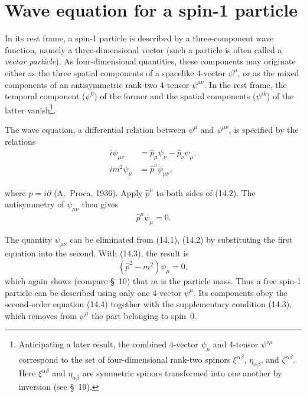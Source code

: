 
\section{Wave equation for a spin-1 particle}

In its rest frame, a spin-1 particle is described by a three-component wave function, namely a three-dimensional vector (such a particle is often called a \emph{vector particle}). As four-dimensional quantities, these components may originate either as the three spatial components of a spacelike 4-vector $\psi^\mu$, or as the mixed components of an antisymmetric rank-two 4-tensor $\psi^{\mu\nu}$. In the rest frame, the temporal component ($\psi^0$) of the former and the spatial components ($\psi^{ik}$) of the latter vanish\footnote{Anticipating a later result, the combined 4-vector $\psi_\mu$ and 4-tensor $\psi^{\nu\mu}$ correspond to the set of four-dimensional rank-two spinors $\xi^{\alpha\beta}$, $\eta_{\dot\alpha\dot\beta}$, and $\zeta^{\dot\alpha\dot\beta}$. Here $\xi^{\alpha\beta}$ and $\eta_{\dot\alpha\dot\beta}$ are symmetric spinors transformed into one another by inversion (see \S~19).}.

The wave equation, a differential relation between $\psi^\mu$ and $\psi^{\mu\nu}$, is specified by the relations
\begin{align}
i\psi_{\mu\nu}&=\widehat p_\mu\psi_\nu-\widehat p_\nu\psi_\mu,
\tag{14.1}\\
im^2\psi_\mu&=\widehat p^\nu\psi_{\mu\nu},
\tag{14.2}
\end{align}

where $\widehat p=i\partial$ (A.~Proca, 1936). Apply $\widehat p^\mu$ to both sides of (14.2). The antisymmetry of $\psi_{\mu\nu}$ then gives
\begin{equation}
\widehat p^\mu\psi_\mu=0.
\tag{14.3}
\end{equation}

The quantity $\psi_{\mu\nu}$ can be eliminated from (14.1), (14.2) by substituting the first equation into the second. With (14.3), the result is
\begin{equation}
(\widehat p^2-m^2)\psi_\mu=0,
\tag{14.4}
\end{equation}
which again shows (compare \S~10) that $m$ is the particle mass. Thus a free spin-1 particle can be described using only one 4-vector $\psi^\mu$. Its components obey the second-order equation (14.4) together with the supplementary condition (14.3), which removes from $\psi^\mu$ the part belonging to spin~0.

